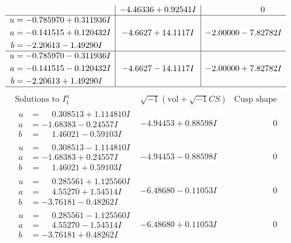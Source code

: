 \documentclass[1p]{elsarticle_modified}
\theoremstyle{definition}
\newcommand{\I}{\sqrt{-1}}
\begin{document}
$$\begin{array}{c|c|c}
 & -4.46336 + 0.92541 I & \phantom{-0.000000 } 0 \\ \hline\begin{aligned}
u &= -0.785970 + 0.311936 I \\
a &= -0.141515 + 0.120432 I \\
b &= -2.20613 - 1.49290 I\end{aligned}
 & -4.6627 + 14.1117 I & -2.00000 - 7.82782 I \\ \hline\begin{aligned}
u &= -0.785970 - 0.311936 I \\
a &= -0.141515 - 0.120432 I \\
b &= -2.20613 + 1.49290 I\end{aligned}
 & -4.6627 - 14.1117 I & -2.00000 + 7.82782 I\\
 \hline 
 \end{array}$$\newpage$$\begin{array}{c|c|c}  
\text{Solutions to }I^u_{1}& \I (\text{vol} + \sqrt{-1}CS) & \text{Cusp shape}\\
 \hline 
\begin{aligned}
u &= \phantom{-}0.308513 + 1.114810 I \\
a &= -1.68383 - 0.24557 I \\
b &= \phantom{-}1.46021 - 0.59103 I\end{aligned}
 & -4.94453 + 0.88598 I & \phantom{-0.000000 } 0 \\ \hline\begin{aligned}
u &= \phantom{-}0.308513 - 1.114810 I \\
a &= -1.68383 + 0.24557 I \\
b &= \phantom{-}1.46021 + 0.59103 I\end{aligned}
 & -4.94453 - 0.88598 I & \phantom{-0.000000 } 0 \\ \hline\begin{aligned}
u &= \phantom{-}0.285561 + 1.125560 I \\
a &= \phantom{-}4.55270 + 1.54514 I \\
b &= -3.76181 - 0.48262 I\end{aligned}
 & -6.48680 - 0.11053 I & \phantom{-0.000000 } 0 \\ \hline\begin{aligned}
u &= \phantom{-}0.285561 - 1.125560 I \\
a &= \phantom{-}4.55270 - 1.54514 I \\
b &= -3.76181 + 0.48262 I\end{aligned}
 & -6.48680 + 0.11053 I & \phantom{-0.000000 } 0 \\ \hline\begin{aligned}

\end{aligned}
\end{array}$$
\end{document}

